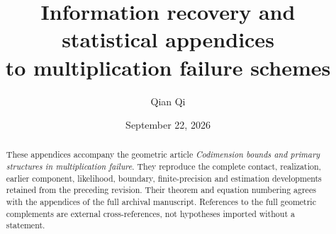 \documentclass[11pt,reqno]{amsart}
\title[Information recovery and statistical appendices]{Information recovery and statistical appendices\\to multiplication failure schemes}
\author{Qian Qi}
\date{September 22, 2026}
\numberwithin{equation}{section}
\theoremstyle{definition}\newtheorem{definition}[theorem]{Definition}
\theoremstyle{remark}\newtheorem{remark}[theorem]{Remark}
\begin{document}
\begin{abstract}
These appendices accompany the geometric article \emph{Codimension bounds and primary structures
in multiplication failure}. They reproduce the
complete contact, realization, earlier component, likelihood, boundary,
finite-precision and estimation developments retained from the preceding
revision. Their theorem and equation numbering agrees with the appendices
of the full archival manuscript. References to the full geometric complements are
external cross-references, not hypotheses imported without a statement.
\end{abstract}
\maketitle
\appendix









\end{document}
